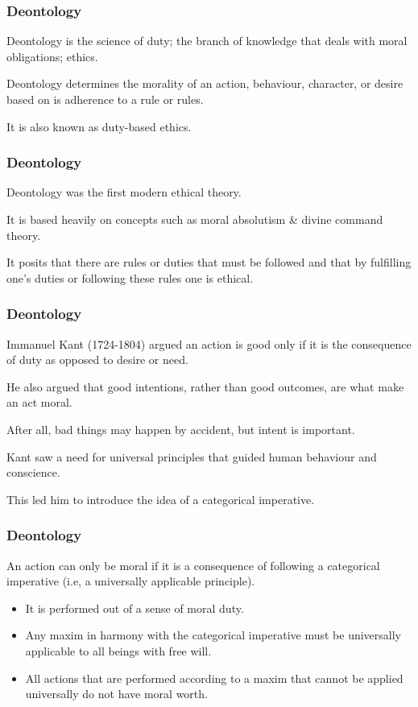 \begin{frame}
\frametitle{Deontology}

\alert{Deontology} is the science of duty; the branch of knowledge that deals with moral obligations; ethics.

Deontology determines the morality of an action, behaviour, character, or desire based on is adherence to a rule or rules.


It is also known as duty-based ethics.


\end{frame}



\begin{frame}
\frametitle{Deontology}

Deontology was the first modern ethical theory. 

It is based heavily on concepts such as moral absolutism \& divine command theory.

It posits that there are rules or duties that must be followed and that by fulfilling one's duties or following these rules one is ethical.

\end{frame}



\begin{frame}
\frametitle{Deontology}

Immanuel Kant (1724-1804) argued an action is good only if it is the consequence of duty as opposed to desire or need.

He also argued that good intentions, rather than good outcomes, are what make an act moral.

After all, bad things may happen by accident, but intent is important.

Kant saw a need for universal principles that guided human behaviour and conscience.

This led him to introduce the idea of a \alert{categorical imperative}.

\end{frame}



\begin{frame}
\frametitle{Deontology}

An action can only be moral if it is a consequence of following a categorical imperative (i.e, a universally applicable principle).

\begin{itemize}
\item It is performed out of a sense of moral duty.
\item Any maxim in harmony with the categorical imperative must be universally applicable to all beings with free will.
\item All actions that are performed according to a maxim that cannot be applied universally do not have moral worth.
\end{itemize}

\end{frame}



